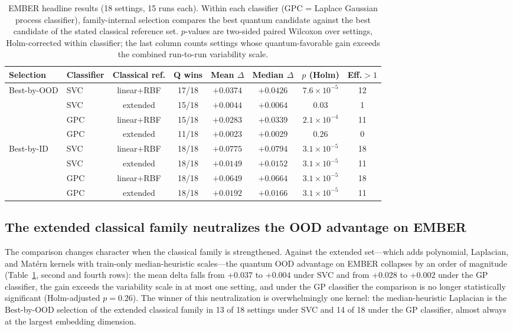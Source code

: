 \documentclass[journal]{IEEEtran}
\begin{document}
\begin{table}[!t]
\centering
\caption{EMBER headline results (18 settings, 15 runs each). Within each classifier (GPC = Laplace Gaussian process classifier), family-internal selection compares the best quantum candidate against the best candidate of the stated classical reference set. $p$-values are two-sided paired Wilcoxon over settings, Holm-corrected within classifier; the last column counts settings whose quantum-favorable gain exceeds the combined run-to-run variability scale.}
\label{tab:family_ember}
\footnotesize
\setlength{\tabcolsep}{3pt}
\begin{tabular}{@{}llcccccc@{}}
\toprule
Selection & Classifier & Classical ref. & Q wins & Mean $\Delta$ & Median $\Delta$ & $p$ (Holm) & Eff.$>1$ \\
\midrule
\multirow{4}{*}{Best-by-OOD} & SVC & linear+RBF & 17/18 & $+0.0374$ & $+0.0426$ & $7.6\times 10^{-5}$ & 12 \\
 & SVC & extended & 15/18 & $+0.0044$ & $+0.0064$ & $0.03$ & 1 \\
 & GPC & linear+RBF & 15/18 & $+0.0283$ & $+0.0339$ & $2.1\times 10^{-4}$ & 11 \\
 & GPC & extended & 11/18 & $+0.0023$ & $+0.0029$ & $0.26$ & 0 \\
\midrule
\multirow{4}{*}{Best-by-ID} & SVC & linear+RBF & 18/18 & $+0.0775$ & $+0.0794$ & $3.1\times 10^{-5}$ & 18 \\
 & SVC & extended & 18/18 & $+0.0149$ & $+0.0152$ & $3.1\times 10^{-5}$ & 11 \\
 & GPC & linear+RBF & 18/18 & $+0.0649$ & $+0.0664$ & $3.1\times 10^{-5}$ & 18 \\
 & GPC & extended & 18/18 & $+0.0192$ & $+0.0166$ & $3.1\times 10^{-5}$ & 11 \\
\bottomrule
\end{tabular}
\end{table}

\subsection{The extended classical family neutralizes the OOD advantage on EMBER}
\label{sec:res_extended}

The comparison changes character when the classical family is strengthened. Against the extended set---which adds polynomial, Laplacian, and Mat\'ern kernels with train-only median-heuristic scales---the quantum OOD advantage on EMBER collapses by an order of magnitude (Table~\ref{tab:family_ember}, second and fourth rows): the mean delta falls from $+0.037$ to $+0.004$ under SVC and from $+0.028$ to $+0.002$ under the GP classifier, the gain exceeds the variability scale in at most one setting, and under the GP classifier the comparison is no longer statistically significant (Holm-adjusted $p=0.26$). The winner of this neutralization is overwhelmingly one kernel: the median-heuristic Laplacian is the Best-by-OOD selection of the extended classical family in 13 of 18 settings under SVC and 14 of 18 under the GP classifier, almost always at the largest embedding dimension.
\end{document}
